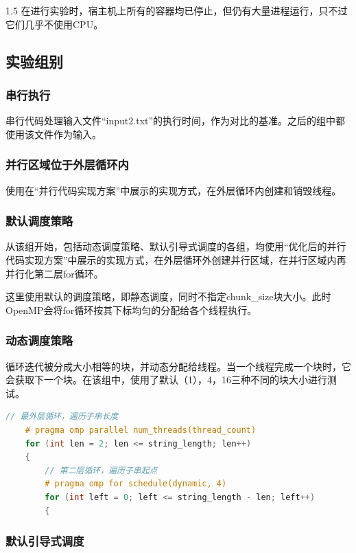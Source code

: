 \documentclass[zihao=-4]{ctexart}
\begin{document}
\begin{spacing}{1.5}
在进行实验时，宿主机上所有的容器均已停止，但仍有大量进程运行，只不过它们几乎不使用CPU。

\subsection{实验组别}

\subsubsection{串行执行}

串行代码处理输入文件“input2.txt”的执行时间，作为对比的基准。之后的组中都使用该文件作为输入。

\subsubsection{并行区域位于外层循环内}

使用在“并行代码实现方案”中展示的实现方式，在外层循环内创建和销毁线程。

\subsubsection{默认调度策略}

从该组开始，包括动态调度策略、默认引导式调度的各组，均使用“优化后的并行代码实现方案”中展示的实现方式，在外层循环外创建并行区域，在并行区域内再并行化第二层for循环。

这里使用默认的调度策略，即静态调度，同时不指定chunk\_size块大小。此时OpenMP会将for循环按其下标均匀的分配给各个线程执行。

\subsubsection{动态调度策略}

循环迭代被分成大小相等的块，并动态分配给线程。当一个线程完成一个块时，它会获取下一个块。在该组中，使用了默认（1），4，16三种不同的块大小进行测试。

\begin{lstlisting}[language=C++,title={块大小为4的动态调度策略}]
    // 最外层循环，遍历子串长度
    # pragma omp parallel num_threads(thread_count)
    for (int len = 2; len <= string_length; len++)
    {
        // 第二层循环，遍历子串起点
        # pragma omp for schedule(dynamic, 4)
        for (int left = 0; left <= string_length - len; left++)
        {
\end{lstlisting}

\subsubsection{默认引导式调度}


\end{spacing}
\end{document}
